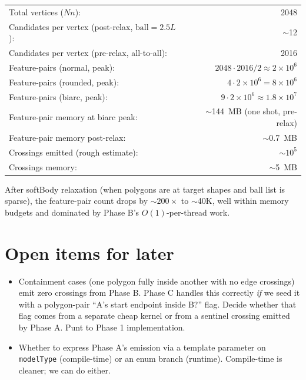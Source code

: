 \documentclass[11pt]{article}
\newcommand{\code}[1]{\texttt{#1}}
\begin{document}
\begin{tabular}{lr}
  Total vertices ($N n$): & 2048 \\
  Candidates per vertex (post-relax, $\text{ball}=2.5L$): & $\sim$12 \\
  Candidates per vertex (pre-relax, all-to-all): & 2016 \\
  Feature-pairs (normal, peak): & $2048 \cdot 2016 / 2 \approx 2 \times 10^6$ \\
  Feature-pairs (rounded, peak): & $4 \cdot 2 \times 10^6 = 8 \times 10^6$ \\
  Feature-pairs (biarc, peak): & $9 \cdot 2 \times 10^6 \approx 1.8 \times 10^7$ \\
  Feature-pair memory at biarc peak: & $\sim$144~MB (one shot, pre-relax) \\
  Feature-pair memory post-relax: & $\sim$0.7~MB \\
  Crossings emitted (rough estimate): & $\sim 10^5$ \\
  Crossings memory: & $\sim$5~MB \\
\end{tabular}

After softBody relaxation (when polygons are at target shapes and
ball list is sparse), the feature-pair count drops by $\sim 200\times$
to $\sim$40K, well within memory budgets and dominated by Phase B's
$O(1)$-per-thread work.

\section{Open items for later}

\begin{itemize}[leftmargin=*]
  \item Containment cases (one polygon fully inside another with no
        edge crossings) emit zero crossings from Phase B. Phase C
        handles this correctly \emph{if} we seed it with a polygon-pair
        ``A's start endpoint inside B?'' flag. Decide whether that
        flag comes from a separate cheap kernel or from a sentinel
        crossing emitted by Phase A. Punt to Phase 1 implementation.
  \item Whether to express Phase A's emission via a template parameter
        on \code{modelType} (compile-time) or an enum branch (runtime).
        Compile-time is cleaner; we can do either.
\end{itemize}
\end{document}
